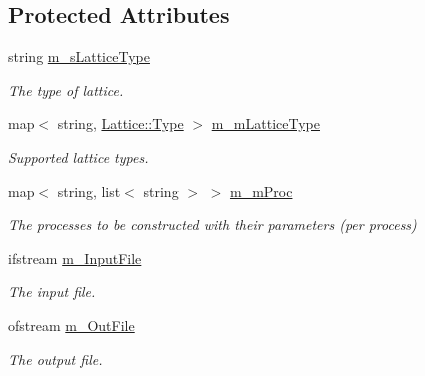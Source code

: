\subsection*{Protected Attributes}
\begin{DoxyCompactItemize}
\item 
\mbox{\label{classIO_a652fb01f8c744913a60b1854a8436ca9}} 
string \mbox{\hyperlink{classIO_a652fb01f8c744913a60b1854a8436ca9}{m\+\_\+s\+Lattice\+Type}}
\begin{DoxyCompactList}\small\item\em The type of lattice. \end{DoxyCompactList}\item 
\mbox{\label{classIO_ae8115e8fa81f4e9d70468f770ac8ec23}} 
map$<$ string, \mbox{\hyperlink{classLattice_a0521158021627f01f6bb0a9c72df65e2}{Lattice\+::\+Type}} $>$ \mbox{\hyperlink{classIO_ae8115e8fa81f4e9d70468f770ac8ec23}{m\+\_\+m\+Lattice\+Type}}
\begin{DoxyCompactList}\small\item\em Supported lattice types. \end{DoxyCompactList}\item 
\mbox{\label{classIO_abebacf3a58f6ac21d9123a296aa7cc5c}} 
map$<$ string, list$<$ string $>$ $>$ \mbox{\hyperlink{classIO_abebacf3a58f6ac21d9123a296aa7cc5c}{m\+\_\+m\+Proc}}
\begin{DoxyCompactList}\small\item\em The processes to be constructed with their parameters (per process) \end{DoxyCompactList}\item 
\mbox{\label{classIO_a1bce4558d452e3dd2237184f854de05a}} 
ifstream \mbox{\hyperlink{classIO_a1bce4558d452e3dd2237184f854de05a}{m\+\_\+\+Input\+File}}
\begin{DoxyCompactList}\small\item\em The input file. \end{DoxyCompactList}\item 
\mbox{\label{classIO_ae8f8764c81d42d331365dd1b73b4fd58}} 
ofstream \mbox{\hyperlink{classIO_ae8f8764c81d42d331365dd1b73b4fd58}{m\+\_\+\+Out\+File}}
\begin{DoxyCompactList}\small\item\em The output file. \end{DoxyCompactList}\item 

\end{DoxyCompactItemize}

